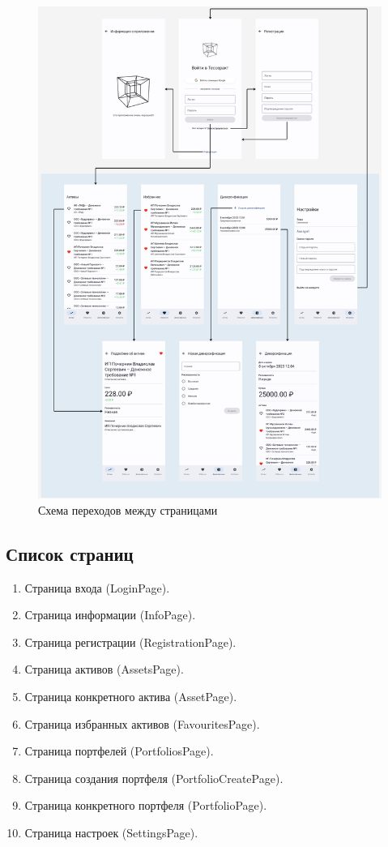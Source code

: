 \documentclass[a4paper, 14pt]{article}
\begin{document}
\begin{figure}[H]
    \centering
    \includegraphics[width=17cm]{resources/3.png}
    \caption{Схема переходов между страницами}
\end{figure}

\subsection{Список страниц}

\begin{enumerate}
    \item Страница входа (LoginPage).
    \item Страница информации (InfoPage).
    \item Страница регистрации (RegistrationPage).
    \item Страница активов (AssetsPage).
    \item Страница конкретного актива (AssetPage).
    \item Страница избранных активов (FavouritesPage).
    \item Страница портфелей (PortfoliosPage).
    \item Страница создания портфеля (PortfolioCreatePage).
    \item Страница конкретного портфеля (PortfolioPage).
    \item Страница настроек (SettingsPage).
\end{enumerate}
\end{document}
